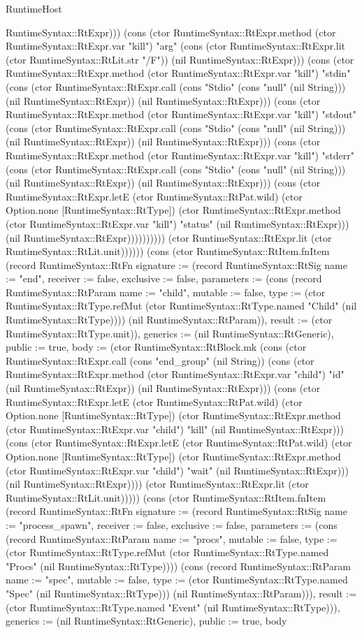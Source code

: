 \begin{lexlean}{RuntimeHost}
\begin{semanticmodule}
{RuntimeSyntax::RtExpr))) (cons (ctor RuntimeSyntax::RtExpr.method (ctor RuntimeSyntax::RtExpr.var "kill") "arg" (cons (ctor RuntimeSyntax::RtExpr.lit (ctor RuntimeSyntax::RtLit.str "/F")) (nil RuntimeSyntax::RtExpr))) (cons (ctor RuntimeSyntax::RtExpr.method (ctor RuntimeSyntax::RtExpr.var "kill") "stdin" (cons (ctor RuntimeSyntax::RtExpr.call (cons "Stdio" (cons "null" (nil String))) (nil RuntimeSyntax::RtExpr)) (nil RuntimeSyntax::RtExpr))) (cons (ctor RuntimeSyntax::RtExpr.method (ctor RuntimeSyntax::RtExpr.var "kill") "stdout" (cons (ctor RuntimeSyntax::RtExpr.call (cons "Stdio" (cons "null" (nil String))) (nil RuntimeSyntax::RtExpr)) (nil RuntimeSyntax::RtExpr))) (cons (ctor RuntimeSyntax::RtExpr.method (ctor RuntimeSyntax::RtExpr.var "kill") "stderr" (cons (ctor RuntimeSyntax::RtExpr.call (cons "Stdio" (cons "null" (nil String))) (nil RuntimeSyntax::RtExpr)) (nil RuntimeSyntax::RtExpr))) (cons (ctor RuntimeSyntax::RtExpr.letE (ctor RuntimeSyntax::RtPat.wild) (ctor Option.none [RuntimeSyntax::RtType]) (ctor RuntimeSyntax::RtExpr.method (ctor RuntimeSyntax::RtExpr.var "kill") "status" (nil RuntimeSyntax::RtExpr))) (nil RuntimeSyntax::RtExpr)))))))))) (ctor RuntimeSyntax::RtExpr.lit (ctor RuntimeSyntax::RtLit.unit)))}))) (cons (ctor RuntimeSyntax::RtItem.fnItem (record RuntimeSyntax::RtFn {signature := (record RuntimeSyntax::RtSig {name := "end", receiver := false, exclusive := false, parameters := (cons (record RuntimeSyntax::RtParam {name := "child", mutable := false, type := (ctor RuntimeSyntax::RtType.refMut (ctor RuntimeSyntax::RtType.named "Child" (nil RuntimeSyntax::RtType)))}) (nil RuntimeSyntax::RtParam)), result := (ctor RuntimeSyntax::RtType.unit)}), generics := (nil RuntimeSyntax::RtGeneric), public := true, body := (ctor RuntimeSyntax::RtBlock.mk (cons (ctor RuntimeSyntax::RtExpr.call (cons "end_group" (nil String)) (cons (ctor RuntimeSyntax::RtExpr.method (ctor RuntimeSyntax::RtExpr.var "child") "id" (nil RuntimeSyntax::RtExpr)) (nil RuntimeSyntax::RtExpr))) (cons (ctor RuntimeSyntax::RtExpr.letE (ctor RuntimeSyntax::RtPat.wild) (ctor Option.none [RuntimeSyntax::RtType]) (ctor RuntimeSyntax::RtExpr.method (ctor RuntimeSyntax::RtExpr.var "child") "kill" (nil RuntimeSyntax::RtExpr))) (cons (ctor RuntimeSyntax::RtExpr.letE (ctor RuntimeSyntax::RtPat.wild) (ctor Option.none [RuntimeSyntax::RtType]) (ctor RuntimeSyntax::RtExpr.method (ctor RuntimeSyntax::RtExpr.var "child") "wait" (nil RuntimeSyntax::RtExpr))) (nil RuntimeSyntax::RtExpr)))) (ctor RuntimeSyntax::RtExpr.lit (ctor RuntimeSyntax::RtLit.unit)))})) (cons (ctor RuntimeSyntax::RtItem.fnItem (record RuntimeSyntax::RtFn {signature := (record RuntimeSyntax::RtSig {name := "process_spawn", receiver := false, exclusive := false, parameters := (cons (record RuntimeSyntax::RtParam {name := "procs", mutable := false, type := (ctor RuntimeSyntax::RtType.refMut (ctor RuntimeSyntax::RtType.named "Procs" (nil RuntimeSyntax::RtType)))}) (cons (record RuntimeSyntax::RtParam {name := "spec", mutable := false, type := (ctor RuntimeSyntax::RtType.named "Spec" (nil RuntimeSyntax::RtType))}) (nil RuntimeSyntax::RtParam))), result := (ctor RuntimeSyntax::RtType.named "Event" (nil RuntimeSyntax::RtType))}), generics := (nil RuntimeSyntax::RtGeneric), public := true, body }
\end{semanticmodule}
\end{lexlean}
